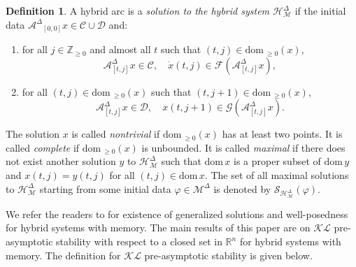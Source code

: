 \documentclass[journal,final,twocolumn]{IEEEtran}
\theoremstyle{definition}
\newtheorem{defn}{Definition}
\begin{document}
\begin{defn}\label{def:sol}
 A hybrid arc is a \emph{solution to the hybrid system ${\mathcal{H}_{\mathcal{M}}^{\Delta}}$} if the initial data ${\mathcal{A}^{\Delta}}_{[0,0]}x\in {\mathcal{C}}\cup {\mathcal{D}}$ and:
 \begin{enumerate}[(S1)]
 \item for all $j\in {\mathbb{Z}}_{\ge 0}$ and almost all $t$ such that $(t,j)\in{\text{dom}\,}_{\ge 0} (x)$,
 \begin{equation}
 {\mathcal{A}_{[t,j]}^{\Delta}} x\in {\mathcal{C}},\quad \dot{x}(t,j)\in {\mathcal{F}}({\mathcal{A}_{[t,j]}^{\Delta}} x),
 \end{equation}
 \item for all $(t,j)\in{\text{dom}\,}_{\ge 0} (x)$ such that $(t,j+1)\in{\text{dom}\,}_{\ge 0} (x)$,
 \begin{equation}
 {\mathcal{A}_{[t,j]}^{\Delta}} x\in {\mathcal{D}},\quad x(t,j+1)\in {\mathcal{G}}({\mathcal{A}_{[t,j]}^{\Delta}} x).
 \end{equation}
 \end{enumerate}
The solution $x$ is called \emph{nontrivial} if ${\text{dom}\,}_{\ge 0}(x)$ has at least two points. It is called \emph{complete} if ${\text{dom}\,}_{\ge 0}(x)$ is unbounded. It is called \emph{maximal} if there does not exist another solution $y$ to ${\mathcal{H}_{\mathcal{M}}^{\Delta}}$ such that ${\text{dom}\,} x$ is a proper subset of ${\text{dom}\,} y$ and $x(t,j)=y(t,j)$ for all $(t,j)\in{\text{dom}\,} x$. The set of all maximal solutions to ${\mathcal{H}_{\mathcal{M}}^{\Delta}}$ starting from some initial data ${\varphi}\in{\mathcal{M}^{\Delta}}$ is denoted by ${\mathcal{S}_{\mathcal{H}_\mathcal{M}^{\Delta}}}({\varphi})$.
\end{defn}

We refer the readers to \cite{liu2012generalized,liu2014hybrid-ifac,liu2014hybrid-siam} for existence of generalized solutions and well-posedness for hybrid systems with memory. The main results of this paper are on ${\mathcal{KL}}$ pre-asymptotic stability with respect to a closed set in ${\mathbb R}^n$ for hybrid systems with memory. The definition for ${\mathcal{KL}}$ pre-asymptotic stability is given below.
\end{document}
